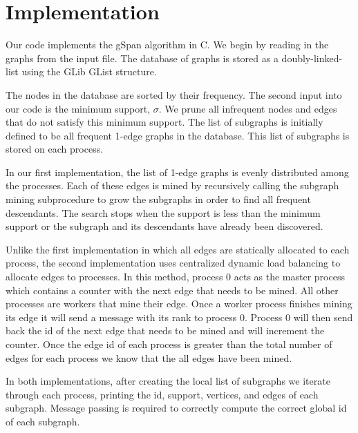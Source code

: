 \section{Implementation}
\label{sec:implementation}

Our code implements the gSpan algorithm in C. We begin by reading in
the graphs from the input file. The database of graphs is
stored as a doubly-linked-list using the GLib GList structure.

The nodes in the database are sorted by their frequency. The second input
into our code is the minimum support, $\sigma$. We prune all infrequent nodes
and edges that do not satisfy this minimum support. The list of subgraphs is
initially defined to be all frequent 1-edge graphs in the database.  This list
of subgraphs is stored on each process.

In our first implementation, the list of 1-edge graphs is evenly distributed
among the processes. Each of these edges is mined by recursively calling the
subgraph mining subprocedure to grow the subgraphs in order to find all
frequent descendants.
The search stops when the support is less than the
minimum support or the subgraph and its descendants have already been
discovered.

Unlike the first implementation in which all edges are statically allocated
to each process, the second implementation uses centralized dynamic
load balancing to allocate edges to processes.
In this method, process 0 acts as the master
process which contains a counter with the next edge that needs to be mined.
All other processes are workers that mine their edge. Once a worker process
finishes mining its edge it will send a message with its rank to process 0.
Process 0 will then send back the id of the next edge that needs to be mined
and will increment the counter. Once the edge id of each process is greater
than the total number of edges for each process we know that the all edges
have been mined. 

In both implementations, after creating the local list of subgraphs we
iterate through each process, printing the id, support, vertices, and
edges of each subgraph.
Message passing is required to correctly compute the correct global 
id of each subgraph.

